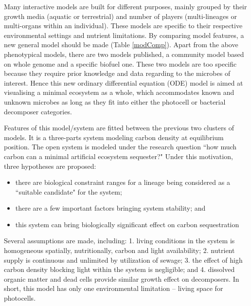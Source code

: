 \documentclass[../thesis.tex]{subfiles} %
\begin{document}
Many interactive models are built for different purposes, mainly grouped by their growth media (aquatic or terrestrial) and number of players (multi-lineages or multi-organs within an individual).  These models are specific to their respective environmental settings and nutrient limitations.  By comparing model features, a new general model should be made (Table \ref{modComp}).  Apart from the above phenotypical models, there are two models published, a community model based on whole genome\autocite{harcombe2014metabolic} and a specific biofuel\autocite{kirthiga2014mathematical} one.  These two models are too specific because they require prior knowledge and data regarding to the microbes of interest.  Hence this new ordinary differential equation (ODE) model is aimed at visualising a minimal ecosystem as a whole, which accommodates known and unknown microbes as long as they fit into either the photocell or bacterial decomposer categories.

Features of this model/system are fitted between the previous two clusters of models.  It is a three-parts system modeling carbon density at equilibrium position.  The open system is modeled under the research question ``how much carbon can a minimal artificial ecosystem sequester?"  Under this motivation, three hypotheses are proposed:
\begin{itemize}
    \item there are biological constraint ranges for a lineage being considered as a ``suitable candidate" for the system;
    \item there are a few important factors bringing system stability; and
    \item this system can bring biologically significant effect on carbon sequestration
\end{itemize}

Several assumptions are made, including: 1. living conditions in the system is homogeneous spatially, nutritionally, carbon and light availability; 2. nutrient supply is continuous and unlimited by utilization of sewage;\autocite{markou2014microalgal} 3. the effect of high carbon density blocking light within the system is negligible; and 4. dissolved organic matter and dead cells provide similar growth effect on decomposers.  In short, this model has only one environmental limitation -- living space for photocells.
\end{document}
